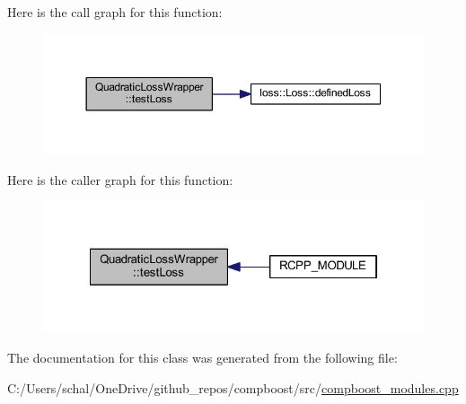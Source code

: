 Here is the call graph for this function\+:\nopagebreak
\begin{figure}[H]
\begin{center}
\leavevmode
\includegraphics[width=350pt]{class_quadratic_loss_wrapper_a9e179437d5d6cffc4e2eb41cf46a2666_cgraph}
\end{center}
\end{figure}
Here is the caller graph for this function\+:\nopagebreak
\begin{figure}[H]
\begin{center}
\leavevmode
\includegraphics[width=322pt]{class_quadratic_loss_wrapper_a9e179437d5d6cffc4e2eb41cf46a2666_icgraph}
\end{center}
\end{figure}


The documentation for this class was generated from the following file\+:\begin{DoxyCompactItemize}
\item 
C\+:/\+Users/schal/\+One\+Drive/github\+\_\+repos/compboost/src/\mbox{\hyperlink{compboost__modules_8cpp}{compboost\+\_\+modules.\+cpp}}\end{DoxyCompactItemize}
